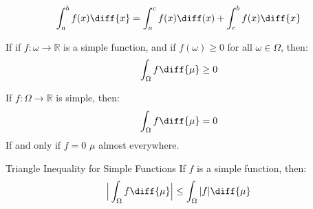                 \begin{equation}
                    \int_{a}^{b}f(x)\diff{x}=
                    \int_{a}^{c}f(x)\diff(x)+
                    \int_{c}^{b}f(x)\diff{x}
                \end{equation}
                \begin{theorem}
                    If if $f:\omega\rightarrow\mathbb{R}$
                    is a simple function, and if
                    $f(\omega)\geq{0}$ for all $\omega\in\Omega$,
                    then:
                    \begin{equation}
                        \int_{\Omega}f\diff{\mu}\geq{0}
                    \end{equation}
                \end{theorem}
                \begin{theorem}
                    If $f:\Omega\rightarrow\mathbb{R}$ is
                    simple, then:
                    \begin{equation}
                        \int_{\Omega}f\diff{\mu}=0
                    \end{equation}
                    If and only if $f=0$ $\mu$ almost everywhere.
                \end{theorem}
                \begin{ftheorem}
                      {Triangle Inequality
                       for Simple Functions}{}
                    If $f$ is a simple function, then:
                    \begin{equation}
                        \Big|\int_{\Omega}f\diff{\mu}\Big|
                        \leq\int_{\Omega}|f|\diff{\mu}
                    \end{equation}
                \end{ftheorem}
